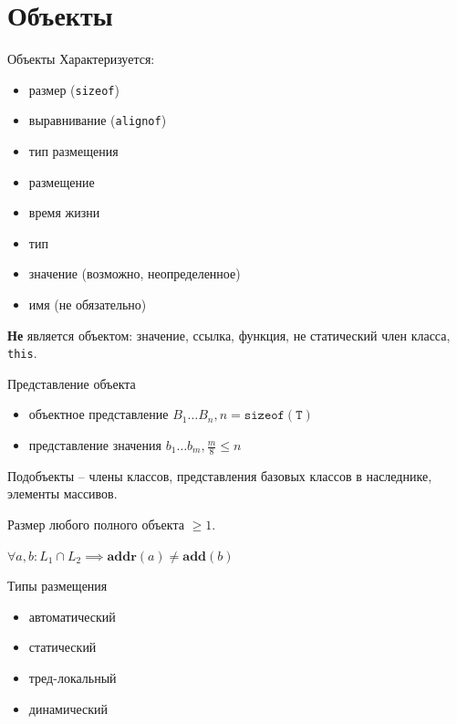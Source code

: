 \documentclass[unknownkeysallowed,xcolor=table]{beamer}
\begin{document}
\section{Объекты}

\begin{frame}{Объекты}
  Характеризуется:
  \begin{itemize}
    \item размер (\lstinline{sizeof})
    \item выравнивание (\lstinline{alignof})
    \item тип размещения
    \item размещение
    \item время жизни
    \item тип
    \item значение (возможно, неопределенное)
    \item имя (не обязательно)
  \end{itemize}

  \vspace{1em}

  \textbf{Не} является объектом: значение, ссылка, функция, не статический член класса, \lstinline{this}.
\end{frame}

\begin{frame}{Представление объекта}
  \begin{itemize}
    \item объектное представление $B_1 \dotso B_n, n = \mathtt{sizeof(T)}$ \vspace{0.5em}
    \item представление значения $b_1 \dotso b_m, \frac{m}{8} \leq n$
  \end{itemize}

  \vspace{2em}

  Подобъекты -- члены классов, представления базовых классов в наследнике, элементы массивов.

  \vspace{2em}

  Размер любого полного объекта $\geq 1$.

  \vspace{2em}

  $\forall a, b: L_1 \cap L_2 \implies \mathbf{addr}(a) \neq \mathbf{add}(b)$
\end{frame}

\begin{frame}{Типы размещения}
  \begin{itemize}
    \item автоматический \vspace{1em}
    \item статический \vspace{1em}
    \item тред-локальный \vspace{1em}
    \item динамический
  \end{itemize}
\end{frame}
\end{document}
